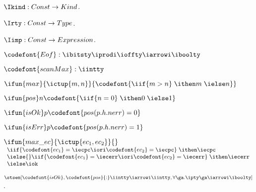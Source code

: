 \begin{description}
\item[Misc.:]
\item $\Ikind : {Const} \rightarrow {Kind}$.
\item $\Irty : {Const} \rightarrow {Type}$.
\item $\Iimp : {Const} \rightarrow {Expression}$.

\item $\codefont {Eof} : \ibitsty \iprodi \ioffty \iarrowi \iboolty$

\item $\codefont{scanMax} : \iintty$

\item $\ifun {max} {\ictup{m,n}} {\codefont{\iif {m>n}\; \ithen m\; \ielse n}}$
\item $\ifun {pos} n {\codefont{\iif {n=0}\; \ithen 0\; \ielse 1}}$
\item $\ifun {isOk} p {\codefont{pos(p.h.nerr) = 0}}$
\item $\ifun {isErr} p {\codefont{pos(p.h.nerr) = 1}}$

\item $\ifun {max\_ec} {\ictup{ec_1, ec_2}} {}$ \\
  $\begin{array}{l}
    \iif {\codefont{ec_1} = \iecpc \iori \codefont{ec_2} = \iecpc}\; \ithen \iecpc \\
    \ielse{} \iif {\codefont{ec_1} = \iecerr \iori \codefont{ec_2} = \iecerr}\; \ithen \iecerr \\
    \ielse \iok
   \end{array}$





\end{description}

\begin{lemma}
  $\stsem[\codefont{isOk},
  \codefont{pos}{:}\iintty \iarrowi \iintty,
  \forall \ga.\ipty \ga \iarrowi \iboolty]$.
\end{lemma}

